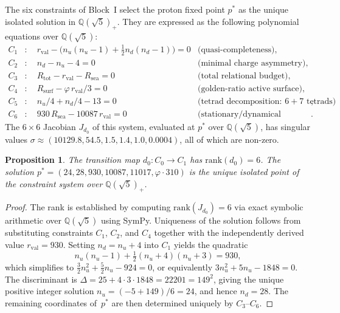 \documentclass[11pt,a4paper]{article}
\newtheorem{proposition}[theorem]{Proposition}
\theoremstyle{definition}
\newcommand{\Rsurf}{R_{\mathrm{surf}}}
\newcommand{\Rsea}{R_{\mathrm{sea}}}
\newcommand{\Rtot}{R_{\mathrm{tot}}}
\newcommand{\rval}{r_{\mathrm{val}}}
\newcommand{\rank}{\mathrm{rank}}
\newcommand{\dmap}[1]{d_{#1}}
\newcommand{\vp}{\varphi}
\begin{document}
The six constraints of Block~I select the proton fixed point $p^*$ as the unique isolated solution in $\mathbb{Q}(\sqrt{5})_+$. They are expressed as the following polynomial equations over $\mathbb{Q}(\sqrt{5})$:
\begin{align*}
  C_1 &: \quad \rval - \bigl(n_u(n_u-1) + \tfrac{1}{2}n_d(n_d-1)\bigr) = 0 &\text{(quasi-completeness)},\\
  C_2 &: \quad n_d - n_u - 4 = 0 &\text{(minimal charge asymmetry)},\\
  C_3 &: \quad \Rtot - \rval - \Rsea = 0 &\text{(total relational budget)},\\
  C_4 &: \quad \Rsurf - \vp\,\rval/3 = 0 &\text{(golden-ratio active surface)},\\
  C_5 &: \quad n_u/4 + n_d/4 - 13 = 0 &\text{(tetrad decomposition: $6+7$ tetrads)},\\
  C_6 &: \quad 930\,\Rsea - 10087\,\rval = 0 &\text{(stationary/dynamical partition)}.
\end{align*}
The $6 \times 6$ Jacobian $J_{\dmap{0}}$ of this system, evaluated at $p^*$ over $\mathbb{Q}(\sqrt{5})$, has singular values $\sigma \approx (10129.8, 54.5, 1.5, 1.4, 1.0, 0.0004)$, all of which are non-zero.

\begin{proposition}
  \label{prop:rank_d0}
  The transition map $\dmap{0} : C_0 \to C_1$ has $\rank(\dmap{0}) = 6$. The solution $p^* = (24, 28, 930, 10087, 11017, \vp \cdot 310)$ is the unique isolated point of the constraint system over $\mathbb{Q}(\sqrt{5})_+$.
\end{proposition}

\begin{proof}
The rank is established by computing $\rank(J_{\dmap{0}}) = 6$ via exact symbolic arithmetic over $\mathbb{Q}(\sqrt{5})$ using SymPy. Uniqueness of the solution follows from substituting constraints $C_1$, $C_2$, and $C_4$ together with the independently derived value $\rval = 930$.\cite{Alpha_PDL_v2_2026} Setting $n_d = n_u + 4$ into $C_1$ yields the quadratic
\[
  n_u(n_u - 1) + \tfrac{1}{2}(n_u+4)(n_u+3) = 930,
\]
which simplifies to $\tfrac{3}{2}n_u^2 + \tfrac{5}{2}n_u - 924 = 0$, or equivalently $3n_u^2 + 5n_u - 1848 = 0$. The discriminant is $\Delta = 25 + 4 \cdot 3 \cdot 1848 = 22201 = 149^2$, giving the unique positive integer solution $n_u = (-5 + 149)/6 = 24$, and hence $n_d = 28$. The remaining coordinates of~$p^*$ are then determined uniquely by $C_3$--$C_6$.
\end{proof}
\end{document}
